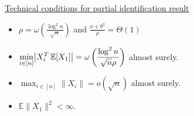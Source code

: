 \documentclass[aspectratio=169]{beamer}
\newcommand{\E}[2][]{%
	\ifthenelse{ \equal{#1}{} }
	{\ensuremath{\mathbb{E} \brac*{#2}}}
	{\ensuremath{\mathbb{E} \brac*{#2 \, \middle \vert \, #1}}}
}
\DeclarePairedDelimiter{\brac}{[}{]}
\DeclarePairedDelimiter{\abs}{\lvert}{\rvert}
\theoremstyle{remark}
\begin{document}
\begin{frame}
    \underline{Technical conditions for partial identification result} \\
    \vspace{6mm}
    \begin{itemize}
        \setlength{\itemsep}{1.75em}
        \item $\rho = \omega \left( \displaystyle \frac{ \log^2 n }{ \sqrt{n} } \right)$ and $\displaystyle \frac{ \nu + b^2 }{ \rho } = \Theta( 1 )$
        \item $\displaystyle \min_{i \in [n]} \abs*{X_i^T \, \E{X_1}} = \omega\left( \frac{ \log^2 n }{ \sqrt{ n } \rho } \right)$ almost surely.
        \item $\displaystyle \max_{i \in [n]} \| X_i \| = o(\sqrt{n})$ almost surely.
        \item $\displaystyle \mathbb E \| X_1 \|^2 < \infty$.
    \end{itemize}
\end{frame}



\end{document}
